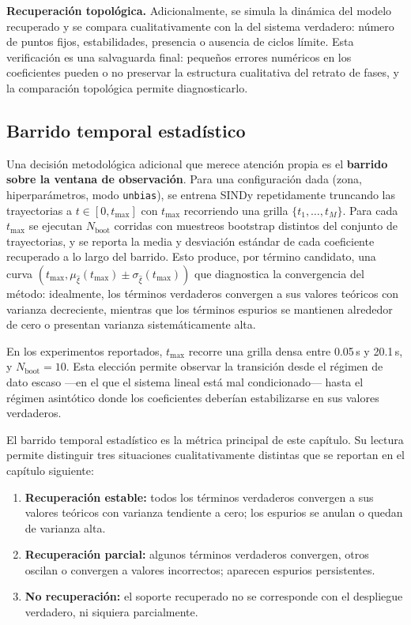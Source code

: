 \textbf{Recuperación topológica.} Adicionalmente, se simula la dinámica del modelo recuperado y se compara cualitativamente con la del sistema verdadero: número de puntos fijos, estabilidades, presencia o ausencia de ciclos límite. Esta verificación es una salvaguarda final: pequeños errores numéricos en los coeficientes pueden o no preservar la estructura cualitativa del retrato de fases, y la comparación topológica permite diagnosticarlo.

\subsection{Barrido temporal estadístico}
\label{3:subsec:barrido_temporal}

Una decisión metodológica adicional que merece atención propia es el \textbf{barrido sobre la ventana de observación}. Para una configuración dada (zona, hiperparámetros, modo \texttt{unbias}), se entrena SINDy repetidamente truncando las trayectorias a $t \in [0, t_{\max}]$ con $t_{\max}$ recorriendo una grilla $\{t_1, \ldots, t_M\}$. Para cada $t_{\max}$ se ejecutan $N_{\text{boot}}$ corridas con muestreos bootstrap distintos del conjunto de trayectorias, y se reporta la media y desviación estándar de cada coeficiente recuperado a lo largo del barrido. Esto produce, por término candidato, una curva $(t_{\max}, \mu_{\hat\xi}(t_{\max}) \pm \sigma_{\hat\xi}(t_{\max}))$ que diagnostica la convergencia del método: idealmente, los términos verdaderos convergen a sus valores teóricos con varianza decreciente, mientras que los términos espurios se mantienen alrededor de cero o presentan varianza sistemáticamente alta.

En los experimentos reportados, $t_{\max}$ recorre una grilla densa entre 0.05\,s y 20.1\,s, y $N_{\text{boot}} = 10$. Esta elección permite observar la transición desde el régimen de dato escaso —en el que el sistema lineal está mal condicionado— hasta el régimen asintótico donde los coeficientes deberían estabilizarse en sus valores verdaderos.

El barrido temporal estadístico es la métrica principal de este capítulo. Su lectura permite distinguir tres situaciones cualitativamente distintas que se reportan en el capítulo siguiente:

\begin{enumerate}
    \item \textbf{Recuperación estable:} todos los términos verdaderos convergen a sus valores teóricos con varianza tendiente a cero; los espurios se anulan o quedan de varianza alta.
    \item \textbf{Recuperación parcial:} algunos términos verdaderos convergen, otros oscilan o convergen a valores incorrectos; aparecen espurios persistentes.
    \item \textbf{No recuperación:} el soporte recuperado no se corresponde con el despliegue verdadero, ni siquiera parcialmente.
\end{enumerate}

